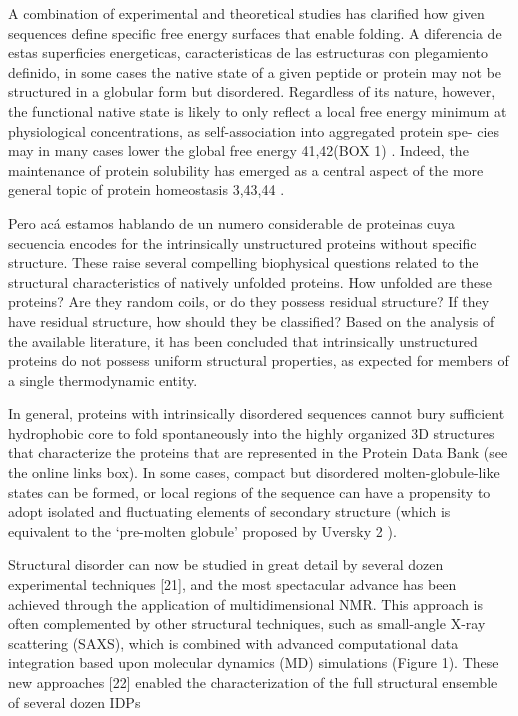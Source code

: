 A combination of experimental and theoretical studies has clarified how given sequences define specific free energy surfaces that enable folding.
A diferencia de estas superficies energeticas, caracteristicas de las estructuras con plegamiento definido, in some cases the native state of a given peptide or protein may not be structured in a globular form but disordered.
Regardless of its nature, however, the functional native state is likely to only reflect a local free energy minimum at physiological concentrations, as self-association into aggregated protein spe-
cies may in many cases lower the global free energy 41,42(BOX 1) . Indeed, the maintenance of protein solubility has emerged as a central aspect of the more general topic of protein homeostasis 3,43,44 .

Pero acá estamos hablando de un numero considerable de proteinas cuya secuencia encodes for the intrinsically unstructured proteins without specific structure.
These raise several compelling biophysical questions related to the structural characteristics of natively unfolded proteins. How unfolded are these proteins? Are they random coils, or do
they possess residual structure? If they have residual structure, how should they be classified?
Based on the analysis of the available literature, it has been concluded that intrinsically unstructured proteins do not possess uniform structural properties, as expected for members of a single thermodynamic entity.


In general, proteins with intrinsically disordered sequences cannot bury sufficient hydrophobic core to fold spontaneously into the highly organized 3D structures that characterize the proteins that are represented in the Protein Data Bank (see the online links
box). In some cases, compact but disordered molten-globule-like states can be formed, or local regions of the sequence can have a propensity to adopt isolated and fluctuating elements of secondary structure (which is equivalent to the ‘pre-molten globule’ proposed by Uversky 2 ). 

Structural disorder can now be studied in great detail by several dozen experimental techniques [21], and the most spectacular advance has been achieved through the application of multidimensional NMR. This approach is often
complemented by other structural techniques, such as small-angle X-ray scattering (SAXS), which is combined with advanced computational data integration based upon molecular dynamics (MD) simulations (Figure 1). These new
approaches [22] enabled the characterization of the full structural ensemble of several dozen IDPs

